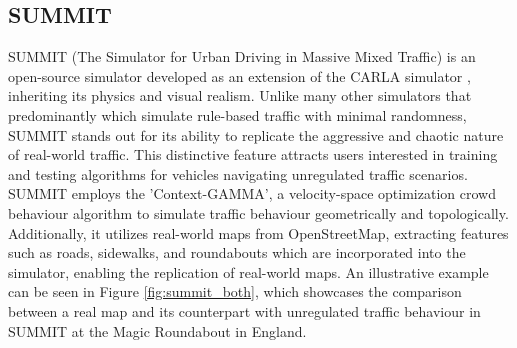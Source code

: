 \documentclass[12pt,twoside,a4paper,parskip]{scrbook} %
\begin{document}
\subsection{SUMMIT}
SUMMIT (The Simulator for Urban Driving in Massive Mixed Traffic) is an open-source simulator developed as an extension of the CARLA simulator \cite{Carla}, inheriting its physics and visual realism. Unlike many other simulators that predominantly which simulate rule-based traffic with minimal randomness, SUMMIT stands out for its ability to replicate the aggressive and chaotic nature of real-world traffic. This distinctive feature attracts users interested in training and testing algorithms for vehicles navigating unregulated traffic scenarios. SUMMIT employs the 'Context-GAMMA', a velocity-space optimization crowd behaviour algorithm \cite{SUMMIT} to simulate traffic behaviour geometrically and topologically. Additionally, it utilizes real-world maps from OpenStreetMap, extracting features such as roads, sidewalks, and roundabouts which are incorporated into the simulator, enabling the replication of real-world maps. An illustrative example can be seen in Figure \ref{fig:summit_both}, which showcases the comparison between a real map and its counterpart with unregulated traffic behaviour in SUMMIT at the Magic Roundabout in England. 
\end{document}
